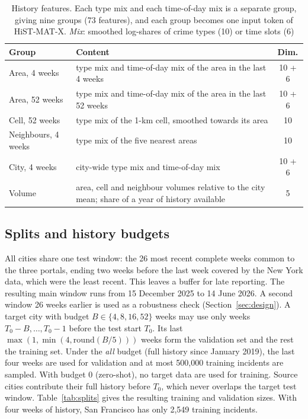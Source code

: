 \documentclass[11pt]{article}
\newcommand{\HMX}{HiST-MAT-X}
\begin{document}
\begin{table}[!htbp]
\centering
\caption{History features. Each type mix and each time-of-day mix is a separate group, giving nine groups (73 features), and each group becomes one input token of \HMX{}. \textit{Mix}: smoothed log-shares of crime types (10) or time slots (6)}
\label{tab:features}
\small
\begin{tabular}{p{3.1cm}p{9.3cm}c}
\toprule
Group & Content & Dim. \\
\midrule
Area, 4 weeks & type mix and time-of-day mix of the area in the last 4 weeks & 10 + 6 \\
Area, 52 weeks & type mix and time-of-day mix of the area in the last 52 weeks & 10 + 6 \\
Cell, 52 weeks & type mix of the 1-km cell, smoothed towards its area & 10 \\
Neighbours, 4 weeks & type mix of the five nearest areas & 10 \\
City, 4 weeks & city-wide type mix and time-of-day mix & 10 + 6 \\
Volume & area, cell and neighbour volumes relative to the city mean; share of a year of history available & 5 \\
\bottomrule
\end{tabular}
\end{table}

\subsection{Splits and history budgets}\label{sec:splits}
All cities share one test window: the 26 most recent complete weeks common to the three portals, ending two weeks before the last week covered by the New York data, which were the least recent. This leaves a buffer for late reporting. The resulting main window runs from 15 December 2025 to 14 June 2026. A second window 26 weeks earlier is used as a robustness check (Section~\ref{sec:design}). A target city with budget $B\in\{4,8,16,52\}$ weeks may use only weeks $T_0-B,\dots,T_0-1$ before the test start $T_0$. Its last $\max(1,\min(4,\mathrm{round}(B/5)))$ weeks form the validation set and the rest the training set. Under the \emph{all} budget (full history since January 2019), the last four weeks are used for validation and at most 500,000 training incidents are sampled. With budget 0 (zero-shot), no target data are used for training. Source cities contribute their full history before $T_0$, which never overlaps the target test window. Table~\ref{tab:splits} gives the resulting training and validation sizes. With four weeks of history, San Francisco has only 2,549 training incidents.
\end{document}
